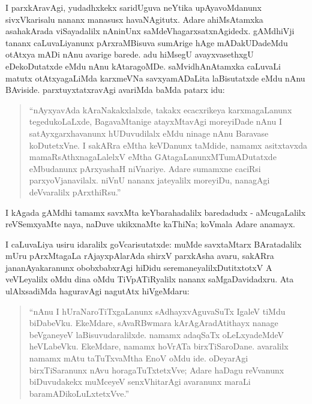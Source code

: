 I parxkAravAgi, yudadhxkekx saridUguva neYtika upAyavoMdanunx sivxVkarisalu nananx manasusx havaNAgitutx. Adare ahiMsAtamxka asahakArada viSayadalilx nAninUnx saMdeVhagarxsatxnAgidedx. gAMdhiVji tananx caLuvaLiyanunx pArxraMBisuva sumArige hAge mADakUDadeMdu otAtxya mADi nAnu avarige barede. adu hiMsegU avayxvasethxgU eDekoDutatxde eMdu nAnu kAtaragoMDe. saMvidhAnAtamxka caLuvaLi matutx otAtxyagaLiMda karxmeVNa savxyamADaLita laBisutatxde eMdu nAnu BAviside. parxtuyxtatxravAgi avariMda baMda patarx idu:

\begin{quote}
``nAyxyavAda kAraNakakxlalxde, takakx ecacxrikeya karxmagaLanunx tegedukoLaLxde, BagavaMtanige atayxMtavAgi moreyiDade nAnu I satAyxgarxhavanunx hUDuvudilalx eMdu ninage nAnu Baravase koDutetxVne. I sakARra eMtha keVDanunx taMdide, namamx asitxtavxda mamaRsAthxnagaLalelxV eMtha GAtagaLanunxMTumADutatxde eMbudanunx pArxyashaH niVnariye. Adare sumamxne caciRsi parxyoVjanavilalx. niVnU nananx jateyalilx moreyiDu, nanagAgi deVvaralilx pArxthiRsu.''
\end{quote}

I kAgada gAMdhi tamamx savxMta keYbarahadalilx baredadudx - aMcugaLalilx reVSemxyaMte naya, naDuve ukikxnaMte kaThiNa; koVmala Adare anamayx.

I caLuvaLiya usiru idaralilx goVcarisutatxde: muMde savxtaMtarx BAratadalilx mUru pArxMtagaLa rAjayxpAlarAda shirxV parxkAsha avaru, sakARra jananAyakaranunx obobxbabxrAgi hiDidu seremaneyalilxDutitxtotxV A veVLeyalilx oMdu dina oMdu TiVpATiRyalilx nananx saMgaDavidadxru. Ata ulAlxsadiMda haguravAgi nagutAtx hiVgeMdaru:

\begin{quote}
``nAnu I hUraNaroTiTxgaLanunx sAdhayxvAguvaSuTx IgaleV tiMdu biDabeVku. EkeMdare, sAvaRBwmara kArAgAradAtithayx nanage beVganeyeV laBisuvudaralilxde. namamx adaqSaTx oLeLxyadeMdeV heVLabeVku. EkeMdare, namamx hoVrATa birxTiSaroDane. avaralilx namamx mAtu taTuTxvaMtha EnoV oMdu ide. oDeyarAgi birxTiSaranunx nAvu horagaTuTxtetxVve; Adare haDagu reVvanunx biDuvudakekx muMceyeV senxVhitarAgi avaranunx maraLi baramADikoLuLxtetxVve.''
\end{quote}

